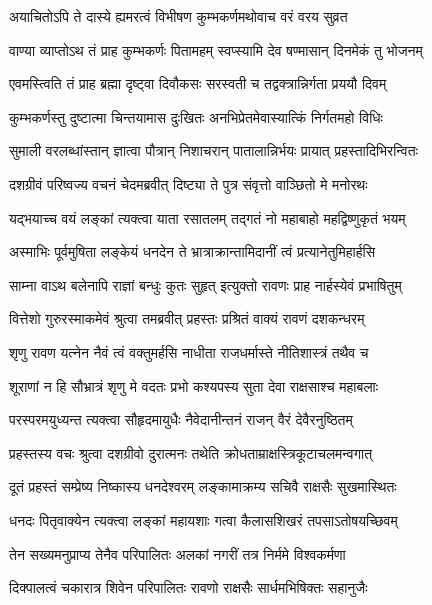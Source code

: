 \twolineshloka
{अयाचितोऽपि ते दास्ये ह्यमरत्वं विभीषण}
{कुम्भकर्णमथोवाच वरं वरय सुव्रत} %

\twolineshloka
{वाण्या व्याप्तोऽथ तं प्राह कुम्भकर्णः पितामहम्}
{स्वप्स्यामि देव षण्मासान् दिनमेकं तु भोजनम्} %

\twolineshloka
{एवमस्त्विति तं प्राह ब्रह्मा दृष्ट्वा दिवौकसः}
{सरस्वती च तद्वक्त्रान्निर्गता प्रययौ दिवम्} %

\twolineshloka
{कुम्भकर्णस्तु दुष्टात्मा चिन्तयामास दुःखितः}
{अनभिप्रेतमेवास्यात्किं निर्गतमहो विधिः} %

\twolineshloka
{सुमाली वरलब्धांस्तान् ज्ञात्वा पौत्रान् निशाचरान्}
{पातालान्निर्भयः प्रायात् प्रहस्तादिभिरन्वितः} %

\twolineshloka
{दशग्रीवं परिष्वज्य वचनं चेदमब्रवीत्}
{दिष्ट्या ते पुत्र संवृत्तो वाञ्छितो मे मनोरथः} %

\twolineshloka
{यद्भयाच्च वयं लङ्कां त्यक्त्वा याता रसातलम्}
{तद्गतं नो महाबाहो महद्विष्णुकृतं भयम्} %

\twolineshloka
{अस्माभिः पूर्वमुषिता लङ्केयं धनदेन ते}
{भ्रात्राक्रान्तामिदानीं त्वं प्रत्यानेतुमिहार्हसि} %

\twolineshloka
{साम्ना वाऽथ बलेनापि राज्ञां बन्धुः कुतः सुहृत्}
{इत्युक्तो रावणः प्राह नार्हस्येवं प्रभाषितुम्} %

\twolineshloka
{वित्तेशो गुरुरस्माकमेवं श्रुत्वा तमब्रवीत्}
{प्रहस्तः प्रश्रितं वाक्यं रावणं दशकन्धरम्} %

\twolineshloka
{शृणु रावण यत्नेन नैवं त्वं वक्तुमर्हसि}
{नाधीता राजधर्मास्ते नीतिशास्त्रं तथैव च} %

\twolineshloka
{शूराणां न हि सौभ्रात्रं शृणु मे वदतः प्रभो}
{कश्यपस्य सुता देवा राक्षसाश्च महाबलाः} %

\twolineshloka
{परस्परमयुध्यन्त त्यक्त्वा सौहृदमायुधैः}
{नैवेदानीन्तनं राजन् वैरं देवैरनुष्ठितम्} %

\twolineshloka
{प्रहस्तस्य वचः श्रुत्वा दशग्रीवो दुरात्मनः}
{तथेति क्रोधताम्राक्षस्त्रिकूटाचलमन्वगात्} %

\twolineshloka
{दूतं प्रहस्तं सम्प्रेष्य निष्कास्य धनदेश्वरम्}
{लङ्कामाक्रम्य सचिवै राक्षसैः सुखमास्थितः} %

\twolineshloka
{धनदः पितृवाक्येन त्यक्त्वा लङ्कां महायशाः}
{गत्वा कैलासशिखरं तपसाऽतोषयच्छिवम्} %

\twolineshloka
{तेन सख्यमनुप्राप्य तेनैव परिपालितः}
{अलकां नगरीं तत्र निर्ममे विश्वकर्मणा} %

\twolineshloka
{दिक्पालत्वं चकारात्र शिवेन परिपालितः}
{रावणो राक्षसैः सार्धमभिषिक्तः सहानुजैः} %

